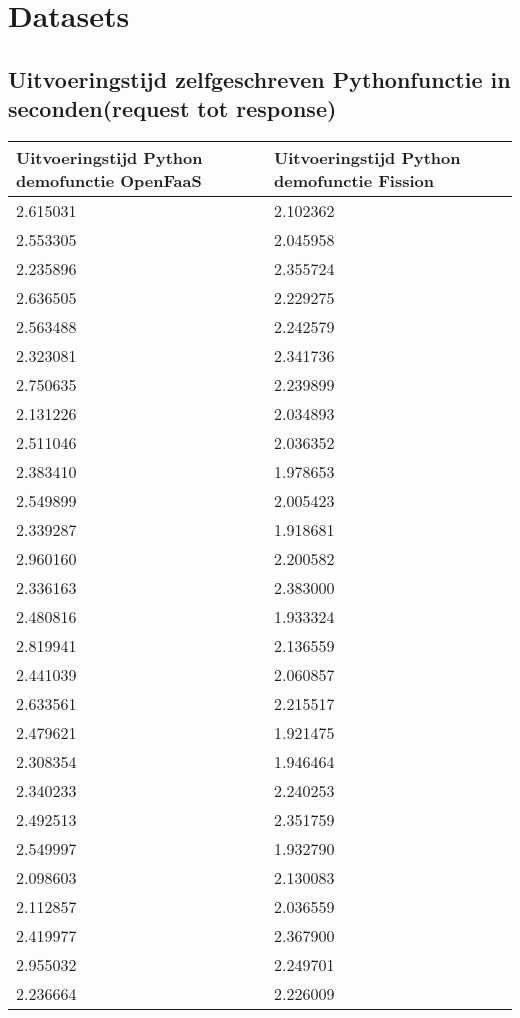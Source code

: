 \section{Datasets}
\subsection{Uitvoeringstijd  zelfgeschreven Pythonfunctie in seconden(request tot response)}
\label{sec:uitvoeringstijd-demofunctie}
\begin{longtable}[c]{ll}
    \textbf{Uitvoeringstijd Python demofunctie OpenFaaS} & \textbf{Uitvoeringstijd Python demofunctie Fission} \\
    \endfirsthead
    \endhead
    2.615031 & 2.102362 \\
    2.553305 & 2.045958 \\
    2.235896 & 2.355724 \\
    2.636505 & 2.229275 \\
    2.563488 & 2.242579 \\
    2.323081 & 2.341736 \\
    2.750635 & 2.239899 \\
    2.131226 & 2.034893 \\
    2.511046 & 2.036352 \\
    2.383410 & 1.978653 \\
    2.549899 & 2.005423 \\
    2.339287 & 1.918681 \\
    2.960160 & 2.200582 \\
    2.336163 & 2.383000 \\
    2.480816 & 1.933324 \\
    2.819941 & 2.136559 \\
    2.441039 & 2.060857 \\
    2.633561 & 2.215517 \\
    2.479621 & 1.921475 \\
    2.308354 & 1.946464 \\
    2.340233 & 2.240253 \\
    2.492513 & 2.351759 \\
    2.549997 & 1.932790 \\
    2.098603 & 2.130083 \\
    2.112857 & 2.036559 \\
    2.419977 & 2.367900 \\
    2.955032 & 2.249701 \\
    2.236664 & 2.226009 \\

\end{longtable}
